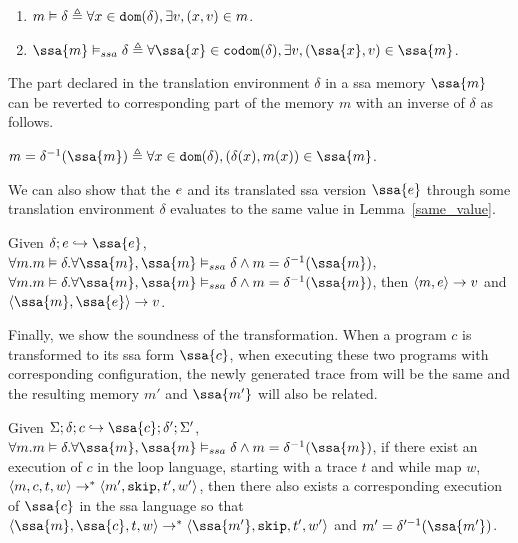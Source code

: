 \begin{defn} 
\begin{enumerate}
    \item $ m \vDash \delta  \triangleq \forall x \in \mathtt{dom}(\delta), \exists v, (x,v) \in m$.
    \item $ \ssa{m} \vDash_{ssa} \delta  \triangleq \forall \ssa{x} \in \codom(\delta), \exists v, (\ssa{x},v) \in \ssa{m}$.
\end{enumerate}
\end{defn}
The part declared in the translation environment $\delta$ in a ssa memory $\ssa{m}$ can be reverted to corresponding part of the memory $m$ with an inverse of $\delta$ as follows.

\begin{defn}
 $m = \delta^{-1}(\ssa{m}) \triangleq \forall x \in \dom(\delta), (\delta(x), m(x)) \in \ssa{m} $.
\end{defn}

We can also show that the $e$ and its translated ssa version $\ssa{\expr}$ through some translation environment $\delta$ evaluates to the same value in Lemma~\ref{same_value}. 
\begin{lem}
\label{same_value}
Given $\delta; e \hookrightarrow \ssa{e}$, $\forall m. m \vDash \delta. \forall \ssa{m}, \ssa{m} \vDash_{ssa} \delta \land m = \delta^{-1}(\ssa{m})$, $\forall m. m \vDash \delta. \forall \ssa{m}, \ssa{m} \vDash_{ssa} \delta \land m = \delta^{-1}(\ssa{m})$, then $\langle m, e \rangle \to v $ and $\config{
\ssa{m}, \ssa{e}} \to {v}$.  
\end{lem}

Finally, we show the soundness of the transformation. When a program $c$ is transformed to its ssa form $\ssa{c}$, when executing these two programs with corresponding configuration, the newly generated trace from will be the same and the resulting memory $m'$ and $\ssa{m'}$ will also be related. 

\begin{thm}
Given $\Sigma; \delta ; c \hookrightarrow \ssa{c} ; \delta';\Sigma' $, $\forall m. m \vDash \delta. \forall \ssa{m}, \ssa{m} \vDash_{ssa} \delta \land m = \delta^{-1}(\ssa{m})$, if there exist an execution of $c$ in the loop language, starting with a trace $t$ and while map $w$, $\langle m, c, t, w \rangle \to^{*} \langle m', \mathtt{skip}, t', w'  \rangle $,  then there also exists a corresponding execution of $\ssa{c}$ in the ssa language so that 
  $\config{  {\ssa{m}}, \ssa{c}, t, w} \to^{*} \config{{  \ssa{m'}}, \eskip, t', w' } $ and $ m' = \delta'^{-1}(\ssa{m'}) $.
\end{thm}



